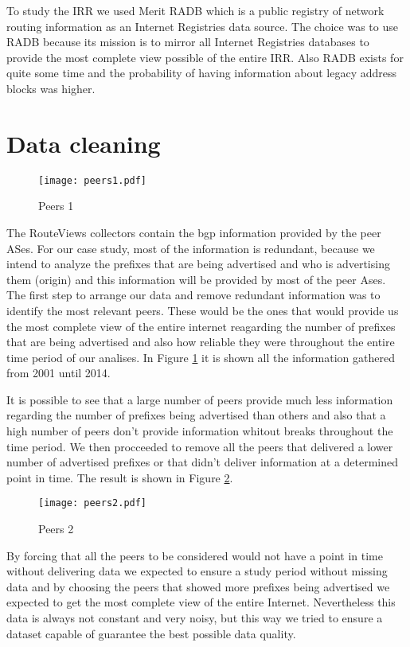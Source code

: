 \documentclass[11pt,a4paper]{scrreprt}
\begin{document}
To study the IRR we used Merit RADB \cite{RADB} which is a public registry of network routing information as an Internet Registries data source. The choice was to use RADB because its mission is to mirror all Internet Registries  databases to provide the most complete view possible of the entire IRR. Also RADB exists for quite some time and the probability of having information about legacy address blocks was higher.  

\section{Data cleaning}

\begin{figure}[!h]
\centering
\texttt{[image: peers1.pdf]}
\caption{Peers 1}
\label{fig:peers1}
\end{figure}

The RouteViews collectors contain the bgp information provided by the peer ASes. For our case study, most of the information is redundant, because we intend to analyze the prefixes that are being advertised and who is advertising them (origin) and this information will be provided by most of the peer Ases. The first step to arrange our data and remove redundant information was to identify the most relevant peers. These would be the ones that would provide us the most complete view of the entire internet reagarding the number of prefixes that are being advertised and also how reliable they were throughout the entire time period of our analises. In Figure \ref{fig:peers1} it is shown all the information gathered from 2001 until 2014. 

It is possible to see that a large number of peers provide much less information regarding the number of prefixes being advertised than others and also that a high number of peers don't provide information whitout breaks throughout the time period. We then procceeded to remove all the peers that delivered a lower number of advertised prefixes or that didn't deliver information at a determined point in time. The result is shown in Figure \ref{fig:peers2}.  

\begin{figure}[!h]
\centering
\texttt{[image: peers2.pdf]}
\caption{Peers 2}
\label{fig:peers2}
\end{figure}

By forcing that all the peers to be considered would not have a point in time without delivering data we expected to ensure a study period without missing data and by choosing the peers that showed more prefixes being advertised we expected to get the most complete view of the entire Internet. Nevertheless this data is always not constant and very noisy, but this way we tried to ensure a dataset capable of guarantee the best possible data quality. 
\end{document}
